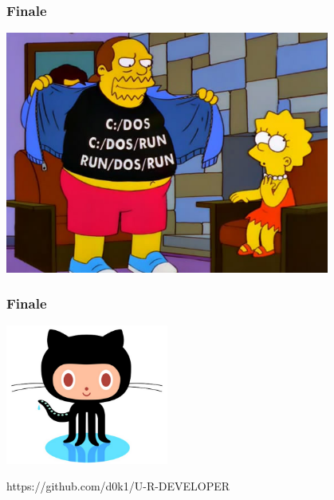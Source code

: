 \documentclass[10pt,pdf,hyperref={unicode}]{beamer}
\begin{document}
\begin{frame}
\frametitle{ Finale }

\center
	\includegraphics[width=0.8\textwidth]{./run_dos_run.png}

\end{frame}

\begin{frame}
\frametitle{ Finale }

\center
	\includegraphics[width=0.4\textwidth]{./github.png}

	https://github.com/d0k1/U-R-DEVELOPER

\end{frame}
\end{document}
